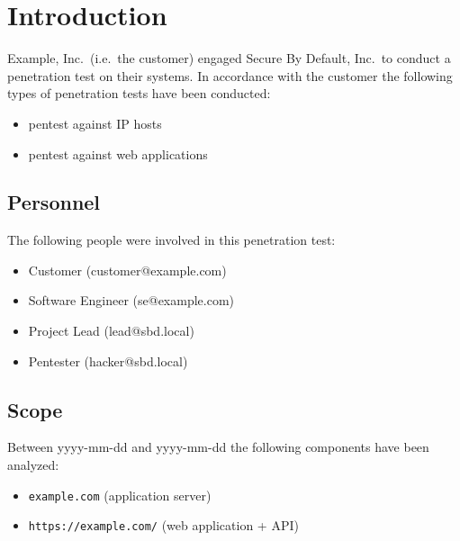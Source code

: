 \documentclass[a4paper]{article}
\newcommand{\passthrough}[1]{\colorbox{code}{\lstset{mathescape=false}#1}}
\begin{document}
\clearpage
\tableofcontents

\clearpage
\section{Introduction}

Example, Inc.\ (i.e.\ the customer) engaged Secure By Default, Inc.\ to conduct a penetration test on their systems.
In accordance with the customer the following types of penetration tests have been conducted:

\begin{itemize}
      \item pentest against IP hosts

      \item pentest against web applications

  \end{itemize}

\subsection{Personnel}

The following people were involved in this penetration test:

\begin{itemize}
      \item Customer (customer@example.com)

      \item Software Engineer (se@example.com)

      \item Project Lead (lead@sbd.local)

      \item Pentester (hacker@sbd.local)

  \end{itemize}

\subsection{Scope}

Between yyyy-mm-dd and yyyy-mm-dd the following components have been analyzed:

\begin{itemize}
      \item \passthrough{\lstinline!example.com!} (application server)

      \item \passthrough{\lstinline!https://example.com/!} (web application + API)

  \end{itemize}
\end{document}
